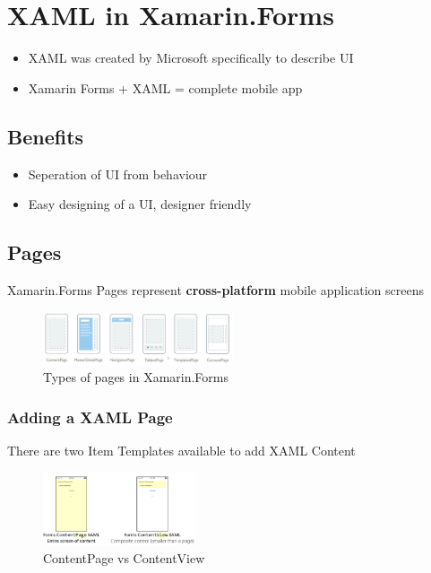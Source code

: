 \documentclass{article}
\newcommand{\bold}[1]{\textbf{#1}}
\begin{document}
\section{XAML in Xamarin.Forms}

\begin{itemize}
    \item XAML was created by Microsoft specifically to describe UI
    \item Xamarin Forms + XAML = complete mobile app
\end{itemize}

\subsection{Benefits}

\begin{itemize}
    \item Seperation of UI from behaviour
    \item Easy designing of a UI, designer friendly
\end{itemize}

\subsection{Pages}

Xamarin.Forms Pages represent \bold{cross-platform} mobile application screens

\begin{figure}[H]
    \centering
    \includegraphics[width=0.5\textwidth]{xaml-page.png}
    \caption{Types of pages in Xamarin.Forms}
\end{figure}

\subsubsection{Adding a XAML Page}

There are two Item Templates available to add XAML Content

\begin{figure}[H]
    \centering
    \includegraphics[width=0.4\textwidth]{contentpage-view.png}
    \caption{ContentPage vs ContentView}
\end{figure}
\end{document}
